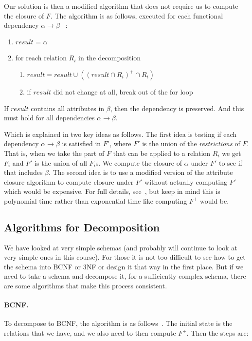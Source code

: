 Our solution is then a modified algorithm that does not require us to compute the closure of $F$. The algorithm is as follows, executed for each functional dependency $\alpha \rightarrow \beta$ ~\cite{dsc}:


\begin{enumerate}
	\item $result$ = $\alpha$
	\item for reach relation $R_{i}$ in the decomposition
	\begin{enumerate}
		\item $result = result \cup (  (result \cap R_{i})^{+} \cap R_{i} )$
	    \item if $result$ did not change at all, break out of the for loop
	    \end{enumerate}
\end{enumerate}

If $result$ contains all attributes in $\beta$, then the dependency is preserved. And this must hold for all dependencies $\alpha \rightarrow \beta$.

Which is explained in two key ideas as follows. The first idea is testing if each dependency $\alpha \rightarrow \beta$ is satisfied in $F'$, where $F'$ is the union of the \textit{restrictions} of $F$. That is, when we take the part of $F$ that can be applied to a relation $R_{i}$ we get $F_{i}$ and $F'$ is the union of all $F_{i}$s. We compute the closure of $\alpha$ under $F'$ to see if that includes $\beta$. The second idea is to use a modified version of the attribute closure algorithm to compute closure under $F'$ without actually computing $F'$ which would be expensive. For full details, see~\cite{dsc}, but keep in mind this is polynomial time rather than exponential time like computing $F^{+}$ would be.

\subsection*{Algorithms for Decomposition}

We have looked at very simple schemas (and probably will continue to look at very simple ones in this course). For those it is not too difficult to see how to get the schema into BCNF or 3NF or design it that way in the first place. But if we need to take a schema and decompose it, for a sufficiently complex schema, there are some algorithms that make this process consistent.

\paragraph{BCNF.}To decompose to BCNF, the algorithm is as follows~\cite{dsc}. The initial state is the relations that we have, and we also need to then compute $F^{+}$. Then the steps are:

